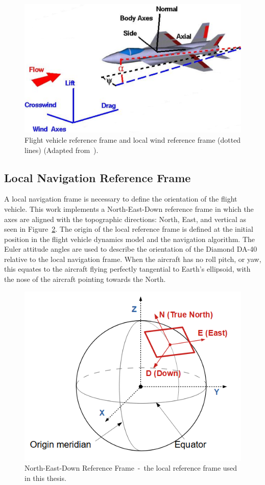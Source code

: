 \begin{figure}[!ht]\label{fig:windframe}
    \centering
    \includegraphics[width=0.75\linewidth]{Figures/windaxes.png}
    \caption{Flight vehicle reference frame and local wind reference frame (dotted lines) (Adapted from~\cite{ForceBalanceCoordinates}).}
\end{figure}

\subsection{Local Navigation Reference Frame}
A local navigation frame is necessary to define the orientation of the flight vehicle. This work implements a North-East-Down reference frame in which the axes are aligned with the topographic directions: North, East, and vertical as seen in Figure~\ref{fig:NEDframe}. The origin of the local reference frame is defined at the initial position in the flight vehicle dynamics model and the navigation algorithm. The Euler attitude angles are used to describe the orientation of the Diamond DA-40 relative to the local navigation frame. When the aircraft has no roll pitch, or yaw, this equates to the aircraft flying perfectly tangential to Earth's ellipsoid, with the nose of the aircraft pointing towards the North.

\begin{figure}[!ht]\label{fig:NEDframe}
    \centering
    \includegraphics[width=0.75\linewidth]{Figures/nedframe.PNG}
    \caption{North-East-Down Reference Frame~-~the local reference frame used in this thesis.}
\end{figure}

